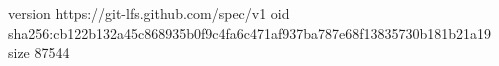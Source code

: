 version https://git-lfs.github.com/spec/v1
oid sha256:cb122b132a45c868935b0f9c4fa6c471af937ba787e68f13835730b181b21a19
size 87544
